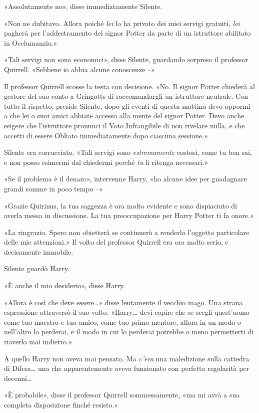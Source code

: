 «Assolutamente no», disse immediatamente Silente.

«Non ne dubitavo. Allora poiché \textit{lei} lo ha privato dei miei servigi gratuiti, \textit{lei} pagherà per l’addestramento del signor Potter da parte di un istruttore abilitato in Occlumanzia.»

«Tali servigi non sono economici», disse Silente, guardando sorpreso il professor Quirrell. «Sebbene io abbia alcune conoscenze –»

Il professor Quirrell scosse la testa con decisione. «No. Il signor Potter chiederà al gestore del suo conto a Gringotts di raccomandargli un istruttore neutrale. Con tutto il rispetto, preside Silente, dopo gli eventi di questa mattina devo oppormi a che lei o suoi amici abbiate accesso alla mente del signor Potter. Devo anche esigere che l’istruttore pronunci il Voto Infrangibile di non rivelare nulla, e che accetti di essere Obliato immediatamente dopo ciascuna sessione.»

Silente era corrucciato. «Tali servigi sono \textit{estremamente} costosi, come tu ben sai, e non posso esimermi dal chiedermi perché \textit{tu} li ritenga necessari.»

«Se il problema è il denaro», intervenne Harry, «ho alcune idee per guadagnare grandi somme in poco tempo –»

«Grazie Quirinus, la tua saggezza è ora molto evidente e sono dispiaciuto di averla messa in discussione. La tua preoccupazione per Harry Potter ti fa onore.»

«La ringrazio. Spero non obietterà se continuerò a renderlo l’oggetto particolare delle mie attenzioni.» Il volto del professor Quirrell era ora molto serio, e decisamente immobile.

Silente guardò Harry.

«È anche il mio desiderio», disse Harry.

«Allora è così che deve essere…» disse lentamente il vecchio mago. Una strana espressione attraversò il suo volto. «Harry… devi capire che se scegli quest’uomo come tuo maestro e tuo amico, come tuo primo mentore, allora in un modo o nell’altro lo perderai, e il modo in cui lo perderai potrebbe o meno permetterti di riaverlo mai indietro.»

A quello Harry non aveva mai pensato. Ma \textit{c’era} una maledizione sulla cattedra di Difesa… una che apparentemente aveva funzionato con perfetta regolarità per decenni…

«È probabile», disse il professor Quirrell sommessamente, «ma mi avrà a sua completa disposizione finché resisto.»

